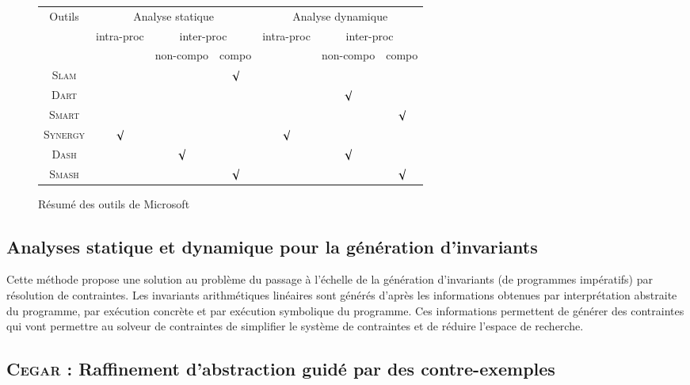 \documentclass[french]{spimufcphdthesis}
\begin{document}
\begin{figure}
  \centering
  \begin{tabular}{|c|c|c|c|c|c|c|}
    \hline
    \multirow{3}{*}{Outils} & \multicolumn{3}{c|}{Analyse statique}
    & \multicolumn{3}{c|}{Analyse dynamique} \\
    & \multirow{2}{*}{intra-proc} & \multicolumn{2}{c|}{inter-proc}
    & \multirow{2}{*}{intra-proc} & \multicolumn{2}{c|}{inter-proc} \\
    & & non-compo & compo & & non-compo & compo \\
    \hline
    \textsc{Slam} \cite{SLAM} & & & $\surd$ & & & \\
    \hline
    \textsc{Dart} \cite{DART} & & & & & $\surd$ & \\
    \hline
    \textsc{Smart} \cite{SMART} & & & & & & $\surd$ \\
    \hline
    \textsc{Synergy} \cite{SYNERGY} & $\surd$ & & & $\surd$ & & \\
    \hline
    \textsc{Dash} \cite{DASH} & & $\surd$ & & & $\surd$ & \\
    \hline
    \textsc{Smash} \cite{SMASH} & & & $\surd$ & & & $\surd$ \\
    \hline
  \end{tabular}
  \caption{Résumé des outils de Microsoft}
  \label{fig:microsoft-summary}
\end{figure}





\subsection{Analyses statique et dynamique pour la génération d'invariants}

Cette méthode \cite{fromTestsToProofs} propose une solution au problème du
passage à l'échelle de la génération d'invariants (de programmes impératifs) par
résolution de contraintes. Les invariants arithmétiques linéaires sont générés
d'après les informations obtenues par interprétation abstraite du programme, par
exécution concrète et par exécution symbolique du programme. Ces informations
permettent de générer des contraintes qui vont permettre au solveur de
contraintes de simplifier le système de contraintes et de réduire l'espace de
recherche.

\subsection{\textsc{Cegar} : Raffinement d'abstraction guidé par des
  contre-exemples}
\end{document}
